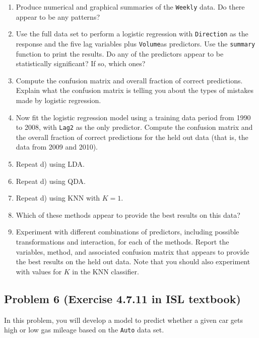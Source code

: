 \documentclass[]{article}
\providecommand{\tightlist}{%
  \setlength{\itemsep}{0pt}\setlength{\parskip}{0pt}}
\begin{document}
\begin{enumerate}
\def\labelenumi{\alph{enumi}.}
\tightlist
\item
  Produce numerical and graphical summaries of the \texttt{Weekly} data.
  Do there appear to be any patterns?\\
\item
  Use the full data set to perform a logistic regression with
  \texttt{Direction} as the response and the five lag variables plus
  \texttt{Volume}as predictors. Use the \texttt{summary} function to
  print the results. Do any of the predictors appear to be statistically
  significant? If so, which ones?\\
\item
  Compute the confusion matrix and overall fraction of correct
  predictions. Explain what the confusion matrix is telling you about
  the types of mistakes made by logistic regression.\\
\item
  Now fit the logistic regression model using a training data period
  from 1990 to 2008, with \texttt{Lag2} as the only predictor. Compute
  the confusion matrix and the overall fraction of correct predictions
  for the held out data (that is, the data from 2009 and 2010).\\
\item
  Repeat d) using LDA.
\item
  Repeat d) using QDA.
\item
  Repeat d) using KNN with \(K=1\).
\item
  Which of these methods appear to provide the best results on this
  data?
\item
  Experiment with different combinations of predictors, including
  possible transformations and interaction, for each of the methods.
  Report the variables, method, and associated confusion matrix that
  appears to provide the best results on the held out data. Note that
  you should also experiment with values for \(K\) in the KNN
  classifier.
\end{enumerate}

\subsection{Problem 6 (Exercise 4.7.11 in ISL
textbook)}\label{problem-6-exercise-4.7.11-in-isl-textbook}

In this problem, you will develop a model to predict whether a given car
gets high or low gas mileage based on the \texttt{Auto} data set.
\end{document}
